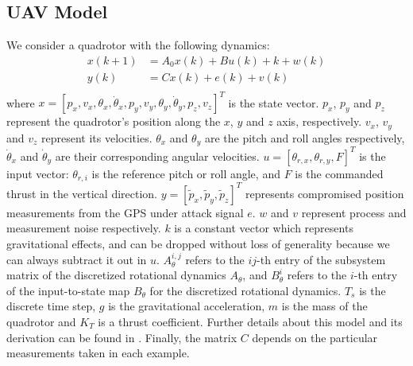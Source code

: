 \documentclass[../../thesis.tex]{subfiles}
\begin{document}
\subsection{UAV Model}

We consider a quadrotor with the following dynamics:
\begin{equation}
\begin{aligned}
x(k+1) &= A_0 x(k) + B u(k)  + k + w(k) \\
y(k) &= C x(k) + e(k) + v(k) \\
\end{aligned}
\end{equation}
where $x = [p_x, v_x, \theta_x, \dot \theta_x, p_y, v_y, \theta_y, \dot\theta_y, p_z, v_z]^T$ is the state vector. $p_x$, $p_y$ and $p_z$ represent the quadrotor's position along the $x$, $y$ and $z$ axis, respectively. $v_x$, $v_y$ and $v_z$ represent its velocities. $\theta_x$ and $\theta_y$ are the pitch and roll angles respectively, $\dot \theta_x$ and $\dot \theta_y$ are their corresponding angular velocities. %
$u = [\theta_{r,x}, \theta_{r,y}, F]^T$ is the input vector: $\theta_{r,i}$ is the reference pitch or roll angle, and $F$ is the commanded thrust in the vertical direction. $y = [\tilde{p}_x, \tilde{p}_y, \tilde{p}_z]^T$ %
represents compromised position measurements from the GPS under attack signal $e$. $w$ and $v$ represent process and measurement noise respectively. $k$ is a constant vector which represents gravitational effects, and can be dropped without loss of generality because we can always subtract it out in $u$. $A_\theta^{i,j}$ refers to the $ij$-th entry of the subsystem matrix of the discretized rotational dynamics $A_\theta$, and $B_\theta^i$ refers to the $i$-th entry of the input-to-state map $B_\theta$ for the discretized rotational dynamics. $T_s$ is the discrete time step, $g$ is the gravitational acceleration, $m$ is the mass of the quadrotor and $K_T$ is a thrust coefficient. Further details about this model and its derivation can be found in \cite{Bouffard}. Finally, the matrix $C$ depends on the particular measurements taken in each example.
\end{document}
